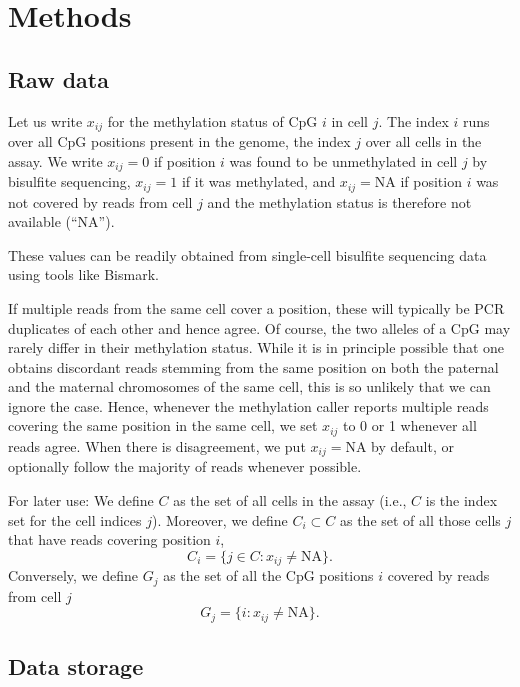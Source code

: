 \documentclass[10pt]{article}
\begin{document}
\clearpage
\section*{Methods}

\subsection*{Raw data}

Let us write $x_{ij}$ for the methylation status of CpG $i$ in cell $j$.
The index $i$ runs over all CpG positions present in the genome, the index $j$ over all cells in the assay.
We write $x_{ij}=0$ if position $i$ was found to be unmethylated in cell $j$ by bisulfite sequencing, $x_{ij}=1$ if it was methylated, and $x_{ij}=\text{NA}$ if position $i$ was not covered by reads from cell $j$ and the methylation status is therefore not available (``NA'').

These values can be readily obtained from single-cell bisulfite sequencing data using tools like Bismark.

If multiple reads from the same cell cover a position, these will typically be PCR duplicates of each other and hence agree.
Of course, the two alleles of a CpG may rarely differ in their methylation status.
While it is in principle possible that one obtains discordant reads stemming from the same position on both the paternal and the maternal chromosomes of the same cell, this is so unlikely that we can ignore the case.
Hence, whenever the methylation caller reports multiple reads covering the same position in the same cell, we set $x_{ij}$ to 0 or 1 whenever all reads agree.
When there is disagreement, we put $x_{ij}=\text{NA}$ by default, or optionally follow the majority of reads whenever possible.

For later use: We define $C$ as the set of all cells in the assay (i.e., $C$ is the index set for the cell indices $j$).
Moreover, we define $C_i\subset C$ as the set of all those cells $j$ that have reads covering position $i$,
\[ C_i=\{j\in C: x_{ij}\neq\text{NA}\}.\]
Conversely, we define $G_j$ as the set of all the CpG positions $i$ covered by reads from cell $j$ 
\[ G_j=\{i: x_{ij}\neq\text{NA}\}.\]

\subsection*{Data storage}
\end{document}
